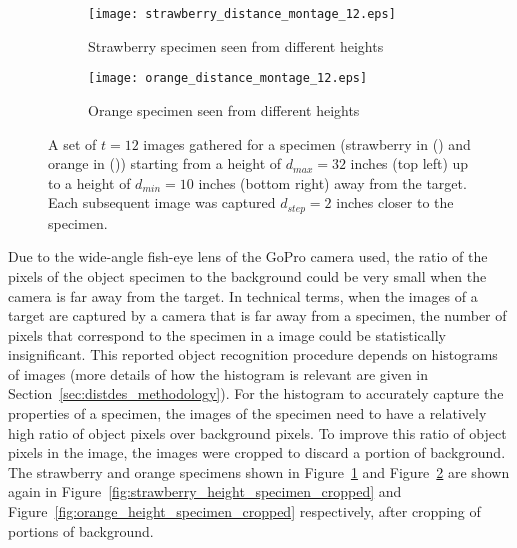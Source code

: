 \begin{figure*}
  \centering
  \begin{subfigure}[]{\textwidth}
      \texttt{[image: strawberry\_distance\_montage\_12.eps]}
      \caption{Strawberry specimen seen from different heights}
      \label{fig:strawberry_height_specimen}
  \end{subfigure}
  \begin{subfigure}[]{\textwidth}
      \texttt{[image: orange\_distance\_montage\_12.eps]}
      \caption{Orange specimen seen from different heights}
      \label{fig:orange_height_specimen}
  \end{subfigure}
\caption[Set of images collected for each specimen from different heights]{A set of $t=12$ images gathered for a specimen (strawberry in () and orange in ()) starting from a height of $d_{max}=32$ inches (top left) up to a height of $d_{min}=10$ inches (bottom right) away from the target.
Each subsequent image was captured $d_{step}=2$ inches closer to the specimen.}
\label{fig:height_specimen}
\end{figure*}	
%
Due to the wide-angle fish-eye lens of the GoPro camera used, the ratio of the pixels of the object specimen to the background could be very small when the camera is far away from the target. In technical terms, when the images of a target are captured by a camera that is far away from a specimen, the number of pixels that correspond to the specimen in a image could be statistically insignificant. This reported object recognition procedure depends on histograms of images (more details of how the histogram is relevant are given in Section~\ref{sec:distdes_methodology}). 
For the histogram to accurately capture the properties of a specimen, the images of the specimen need to have a relatively high ratio of object pixels over background pixels. To improve this ratio of object pixels in the image, the images were cropped to discard a portion of background. The strawberry and orange specimens shown in Figure~\ref{fig:strawberry_height_specimen} and Figure~\ref{fig:orange_height_specimen} are shown again in Figure~\ref{fig:strawberry_height_specimen_cropped} and 
Figure~\ref{fig:orange_height_specimen_cropped} respectively, after cropping of portions of background.

